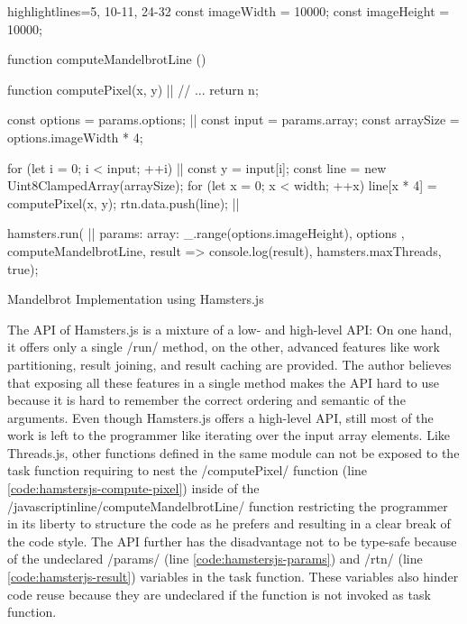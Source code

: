 \begin{listing}
\begin{javascriptcode*}{highlightlines={5, 10-11, 24-32}}
const imageWidth = 10000;
const imageHeight = 10000;

function computeMandelbrotLine () {
	function computePixel(x, y) {|$\label{code:hamstersjs-compute-pixel}$|
		// ...
		return n;
	}

	const options = params.options; |$\label{code:hamstersjs-params}$|
	const input = params.array;
	const arraySize = options.imageWidth * 4;

	for (let i = 0; i < input; ++i) {|$\label{code:hamsterjs-iterate}$|
		const y = input[i];
		const line = new Uint8ClampedArray(arraySize);
		for (let x = 0; x < width; ++x) {
			line[x * 4] = computePixel(x, y);
		}
		rtn.data.push(line); |$\label{code:hamsterjs-result}$|
	}
}

hamsters.run( |$\label{code:hamsterjs-start}$|
	params: {
		array: _.range(options.imageHeight),
		options
	},  
	computeMandelbrotLine, 
	result => console.log(result), 
	hamsters.maxThreads, 
	true);
\end{javascriptcode*}
\caption{Mandelbrot Implementation using Hamsters.js}
\label{fig:mandelbrot-hamsterjs}
\end{listing}

The API of Hamsters.js is a mixture of a low- and high-level API: On one hand, it offers only a single \javascriptinline/run/ method, on the other, advanced features like work partitioning, result joining, and result caching are provided. The author believes that exposing all these features in a single method makes the API hard to use because it is hard to remember the correct ordering and semantic of the arguments. Even though Hamsters.js offers a high-level API, still most of the work is left to the programmer like iterating over the input array elements. Like Threads.js, other functions defined in the same module can not be exposed to the task function requiring to nest the \javascriptinline/computePixel/ function (line \ref{code:hamstersjs-compute-pixel}) inside of the /javascriptinline/computeMandelbrotLine/ function restricting the programmer in its liberty to structure the code as he prefers and resulting in a clear break of the code style. The API further has the disadvantage not to be type-safe because of the undeclared \javascriptinline/params/ (line \ref{code:hamstersjs-params}) and \javascriptinline/rtn/ (line \ref{code:hamsterjs-result}) variables in the task function. These variables also hinder code reuse because they are undeclared if the function is not invoked as task function.


